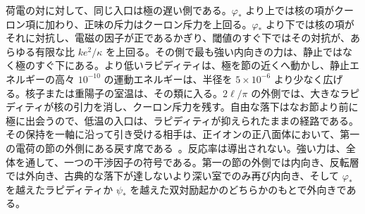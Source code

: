\documentclass[a4paper]{article}
\begin{document}
荷電の対に対して、同じ入口は極の遅い側である。\(\varphi_*\) より上では核の項がクーロン項に加わり、正味の斥力はクーロン斥力を上回る。\(\varphi_*\) より下では核の項がそれに対抗し、電磁の因子が正であるかぎり、閾値のすぐ下ではその対抗が、あらゆる有限な比 \(k e^{2}/\kappa\) を上回る。その側で最も強い内向きの力は、静止ではなく極のすぐ下にある。より低いラピディティは、極を節の近くへ動かし、静止エネルギーの高々 \(10^{-10}\) の運動エネルギーは、半径を \(5\times 10^{-6}\) より少なく広げる。核子または重陽子の室温は、その類に入る。\(2\ell/\pi\) の外側では、大きなラピディティが核の引力を消し、クーロン斥力を残す。自由な落下はなお節より前に極に出会うので、低温の入口は、ラピディティが抑えられたままの経路である。その保持を一軸に沿って引き受ける相手は、正イオンの正八面体において、第一の電荷の節の外側にある戻す席である~\cite{dst-cold}。反応率は導出されない。強い力は、全体を通して、一つの干渉因子の符号である。第一の節の外側では内向き、反転層では外向き、古典的な落下が達しないより深い室でのみ再び内向き、そして \(\varphi_*\) を越えたラピディティか \(\psi_*\) を越えた双対励起かのどちらかのもとで外向きである。
\end{document}
